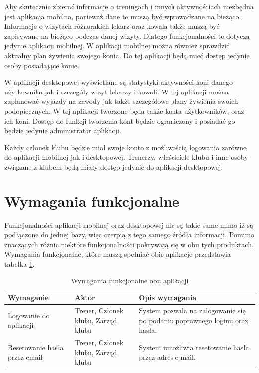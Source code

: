 \documentclass[12pt,twoside]{report}
\begin{document}
Aby skutecznie zbierać informacje o treningach i innych aktywnościach niezbędna jest aplikacja mobilna, ponieważ dane te muszą być wprowadzane na bieżąco. Informacje o wizytach różnorakich lekarz oraz kowala także muszą być zapisywane na bieżąco podczas danej wizyty. Dlatego funkcjonalności te dotyczą jedynie aplikacji mobilnej. W aplikacji mobilnej można również sprawdzić aktualny plan żywienia swojego konia. Do tej aplikacji będą mieć dostęp jedynie osoby posiadające konie. 

W aplikacji desktopowej wyświetlane są statystyki aktywności koni danego użytkownika jak i szczegóły wizyt lekarzy i kowali. W tej aplikacji można zaplanować wyjazdy na zawody jak także szczegółowe plany żywienia swoich podopiecznych. W tej aplikacji tworzone  będą także konta użytkowników, oraz ich koni. Dostęp do funkcji tworzenia kont będzie ograniczony i posiadać go będzie jedynie administrator aplikacji.

Każdy członek klubu będzie miał swoje konto z możliwością logowania zarówno do aplikacji mobilnej jak i desktopowej. Trenerzy, właściciele klubu i inne osoby związane z klubem będą miały dostęp jedynie do aplikacji desktopowej. 


\section{Wymagania funkcjonalne}
Funkcjonalności aplikacji mobilnej oraz desktopowej nie są takie same mimo iż są podłączone do jednej bazy, więc czerpią z tego samego źródła informacji. Pomimo znaczących różnic niektóre funkcjonalności pokrywają się w obu tych produktach. 
Wymagania funkcjonalne, które muszą spełniać obie aplikacje przedstawia tabelka \ref{funkcjonalneObuApek}.
\begin{table}[H]
	\centering
\begin{tabular}{|p{4.5cm}|p{4cm}|p{7cm}|}			
	\hline
	Wymaganie & Aktor & Opis wymagania\\
	\hline
	Logowanie do aplikacji& Trener, Członek klubu, Zarząd klubu & System pozwala na zalogowanie się po podaniu poprawnego loginu oraz hasła.\\
	\hline
	Resetowanie hasła przez email & Trener, Członek klubu, Zarząd klubu& System umożliwia resetowanie hasła przez adres e-mail. \\
	\hline
	
\end{tabular}
	\caption{Wymagania funkcjonalne obu aplikacji}
	\label{funkcjonalneObuApek}
\end{table}
\end{document}
